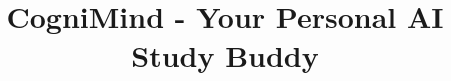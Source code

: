 \documentclass[twoside,final]{hcmut-report}
\title{CogniMind - Your Personal AI Study Buddy}
\begin{document}
\coverpage%


\tableofcontents

\clearpage










\nocite{*}
\end{document}
